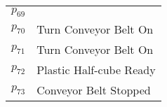 \begin{table}[H]
\begin{tabular}{M{5cm}M{10cm}}
\hyperlink{partialNet:p691}{\hypertarget{partialTable:p69}{$p_{69}$}} & \\
\hyperlink{partialNet:p701}{\hypertarget{partialTable:p70}{$p_{70}$}} & Turn Conveyor Belt On\\
\hyperlink{partialNet:p711}{\hypertarget{partialTable:p71}{$p_{71}$}} & Turn Conveyor Belt On\\
\hyperlink{partialNet:p721}{\hypertarget{partialTable:p72}{$p_{72}$}} & Plastic Half-cube Ready\\
\hyperlink{partialNet:p731}{\hypertarget{partialTable:p73}{$p_{73}$}} & Conveyor Belt Stopped\\
\end{tabular}
\end{table}
